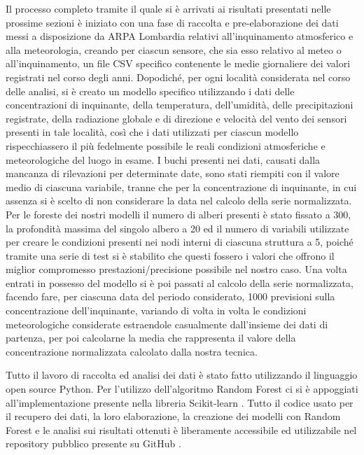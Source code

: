 Il processo completo tramite il quale si è arrivati ai risultati presentati nelle prossime sezioni è iniziato con una fase di raccolta e pre-elaborazione dei dati messi a disposizione da ARPA 
Lombardia relativi all'inquinamento atmosferico e alla meteorologia, creando per ciascun sensore, che sia esso relativo al meteo o all'inquinamento, un file CSV specifico contenente le medie giornaliere dei valori registrati nel corso degli anni. Dopodiché, per ogni località considerata nel corso delle analisi, si è creato un modello specifico utilizzando i dati delle concentrazioni di inquinante, della temperatura, dell'umidità, delle precipitazioni registrate, della radiazione globale e di direzione e velocità del vento dei sensori presenti in tale località, così che i dati utilizzati per ciascun modello rispecchiassero il più fedelmente possibile le reali condizioni atmosferiche e meteorologiche del luogo in esame. I buchi presenti nei dati, causati dalla mancanza di rilevazioni per determinate date, sono stati riempiti con il valore medio di ciascuna variabile, tranne che per la concentrazione di inquinante, in cui assenza si è scelto di non considerare la data nel calcolo della serie normalizzata.
Per le foreste dei nostri modelli il numero di alberi presenti è stato fissato a 300, la profondità massima del singolo albero a 20 ed il numero di variabili utilizzate per creare le condizioni presenti nei nodi interni di ciascuna struttura a 5, poiché tramite una serie di test si è stabilito che questi fossero i valori che offrono il miglior compromesso prestazioni/precisione possibile nel nostro caso. Una volta entrati in possesso del modello si è poi passati al calcolo della serie normalizzata, facendo fare, per ciascuna data del periodo considerato, 1000 previsioni sulla concentrazione dell'inquinante, variando di volta in volta le condizioni meteorologiche considerate estraendole casualmente dall'insieme dei dati di partenza, per poi calcolarne la media che rappresenta il valore della concentrazione normalizzata calcolato dalla nostra tecnica. 

Tutto il lavoro di raccolta ed analisi dei dati è stato fatto utilizzando il linguaggio open source Python. Per l'utilizzo dell'algoritmo Random Forest ci si è appoggiati all'implementazione presente nella libreria Scikit-learn \cite{scikit-learn}. Tutto il codice usato per il recupero dei dati, la loro elaborazione, la creazione dei modelli con Random Forest e le analisi sui risultati ottenuti è liberamente accessibile ed utilizzabile nel repository pubblico presente su GitHub \cite{belotti2020}.


